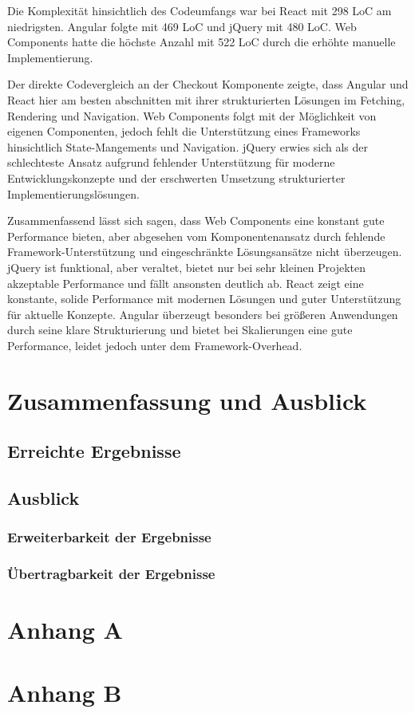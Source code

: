 \documentclass[oneside]{ausarbeitung}
\begin{document}
Die Komplexität hinsichtlich des Codeumfangs war bei React mit 298 LoC am niedrigsten. Angular folgte mit 469 LoC und jQuery mit 480 LoC. Web Components hatte die höchste Anzahl mit 522 LoC durch die erhöhte manuelle Implementierung. 

Der direkte Codevergleich an der Checkout Komponente zeigte, dass Angular und React hier am besten abschnitten mit ihrer strukturierten Lösungen im Fetching, Rendering und Navigation. Web Components folgt mit der Möglichkeit von eigenen Componenten, jedoch fehlt die Unterstützung eines Frameworks hinsichtlich State-Mangements und Navigation. jQuery erwies sich als der schlechteste Ansatz aufgrund fehlender Unterstützung für moderne Entwicklungskonzepte und der erschwerten Umsetzung strukturierter Implementierungslösungen.

Zusammenfassend lässt sich sagen, dass Web Components eine konstant gute Performance bieten, aber abgesehen vom Komponentenansatz durch fehlende Framework-Unterstützung und eingeschränkte Lösungsansätze nicht überzeugen. jQuery ist funktional, aber veraltet, bietet nur bei sehr kleinen Projekten akzeptable Performance und fällt ansonsten deutlich ab. React zeigt eine konstante, solide Performance mit modernen Lösungen und guter Unterstützung für aktuelle Konzepte. Angular überzeugt besonders bei größeren Anwendungen durch seine klare Strukturierung und bietet bei Skalierungen eine gute Performance, leidet jedoch unter dem Framework-Overhead.

\chapter{Zusammenfassung und Ausblick}
\label{cha:zusammenfassung}

\section{Erreichte Ergebnisse}
\label{sec:ergebnisse}

\section{Ausblick}
\label{sec:ausblick}

\subsection{Erweiterbarkeit der Ergebnisse}
\label{sub:erweiterbarkeit}

\subsection{Übertragbarkeit der Ergebnisse}
\label{sub:uebertragbarkeit}

\appendix

\printbibliography

\chapter{Anhang A}

\chapter{Anhang B}
\end{document}
